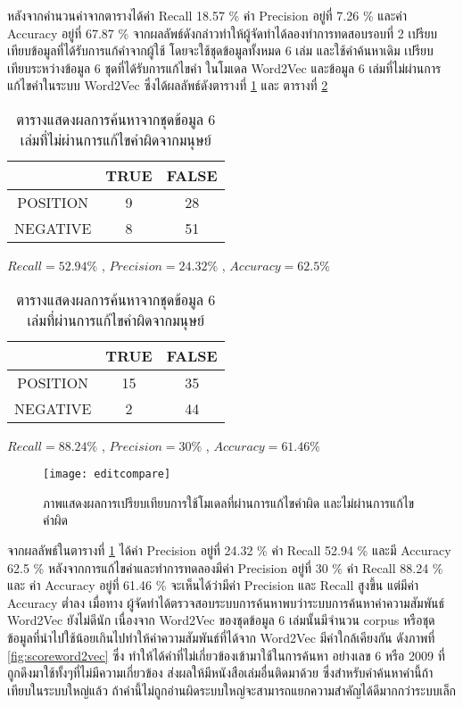     หลังจากคำนวนค่าจากตารางได้ค่า Recall 18.57 \% ค่า Precision อยู่ที่ 7.26 \% และค่า Accuracy อยู่ที่ 67.87 \%  
    จากผลลัพธ์ดังกล่าวทำให้ผู้จัดทำได้ลองทำการทดสอบรอบที่ 2 เปรียบเทียบข้อมูลที่ได้รับการแก้คำจากผู้ใช้ 
    โดยจะใช้ชุดข้อมูลทั้งหมด 6 เล่ม และใช้คำค้นหาเดิม เปรียบเทียบระหว่างข้อมูล 6 ชุดที่ได้รับการแก้ไขคำ
    ในโมเดล Word2Vec และข้อมูล 6 เล่มที่ไม่ผ่านการแก้ไขคำในระบบ Word2Vec ซึ่งได้ผลลัพธ์ดังตารางที่ 
    \ref{tbl:evasearch2} และ ตารางที่ \ref{tbl:evasearch3}

\begin{table}[H]
    \caption{ตารางแสดงผลการค้นหาจากชุดข้อมูล 6 เล่มที่ไม่ผ่านการแก้ไขคำผิดจากมนุษย์}\label{tbl:evasearch2}
    \begin{tabular}{|c|c|c|}
    \hline
                & TRUE & FALSE \\ \hline
    POSITION & 9   & 28   \\ \hline
    NEGATIVE & 8   & 51   \\ \hline
    \end{tabular}
    \end{table}
    $Recall = 52.94 \%$ , $Precision = 24.32 \%$ , $Accuracy = 62.5 \%$

\begin{table}[H]
    \caption{ตารางแสดงผลการค้นหาจากชุดข้อมูล 6 เล่มที่ผ่านการแก้ไขคำผิดจากมนุษย์}\label{tbl:evasearch3}
    \begin{tabular}{|c|c|c|}
    \hline
                & TRUE & FALSE \\ \hline
    POSITION & 15   & 35   \\ \hline
    NEGATIVE & 2   & 44   \\ \hline
    \end{tabular}
    \end{table}
    $Recall = 88.24 \%$ , $Precision = 30 \%$ , $Accuracy = 61.46 \%$

\begin{figure}[H]
    \centering
    \texttt{[image: editcompare]}
    \caption{ภาพแสดงผลการเปรียบเทียบการใช้โมเดลที่ผ่านการแก้ไขคำผิด และไม่ผ่านการแก้ไขคำผิด}\label{fig:editcompare}
\end{figure}
    
    จากผลลัพธ์ในตารางที่ \ref{tbl:evasearch2} ได้ค่า Precision อยู่ที่ 24.32 \% ค่า Recall 52.94 \% และมี 
    Accuracy 62.5 \% หลังจากการแก้ไขคำและทำการทดลองมีค่า Precision อยู่ที่ 30 \% ค่า Recall 88.24 \% และ
    ค่า Accuracy อยู่ที่ 61.46 \% จะเห็นได้ว่ามีค่า Precision และ Recall สูงขึ้น แต่มีค่า Accuracy ต่ำลง เมื่อทาง
    ผู้จัดทำได้ตรวจสอบระบบการค้นหาพบว่าระบบการค้นหาค่าความสัมพันธ์ Word2Vec ยังไม่ดีนัก เนื่องจาก 
    Word2Vec ของชุดข้อมูล 6 เล่มนั้นมีจำนวน corpus หรือชุดข้อมูลที่นำไปใช้น้อยเกินไปทำให้ค่าความสัมพันธ์ที่ได้จาก 
    Word2Vec มีค่าใกล้เคียงกัน ดังภาพที่ \ref{fig:scoreword2vec} ซึ่ง ทำให้ได้คำที่ไม่เกี่ยวข้องเข้ามาใช้ในการค้นหา อย่างเลข 6 
    หรือ 2009 ที่ถูกดึงมาใช้ทั้งๆที่ไม่มีความเกี่ยวข้อง ส่งผลให้มีหนังสือเล่มอื่นติดมาด้วย ซึ่งสำหรับคำค้นหาคำนี้ถ้า
    เทียบในระบบใหญ่แล้ว ถ้าคำนี้ไม่ถูกอ่านผิดระบบใหญ่จะสามารถแยกความสำคัญได้ดีมากกว่าระบบเล็ก
    
